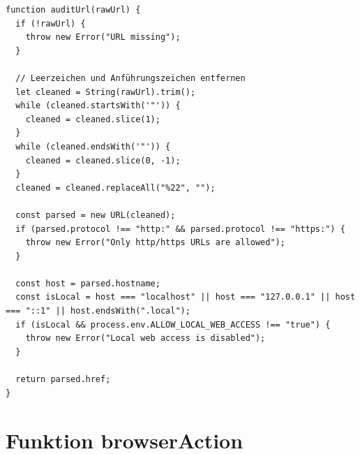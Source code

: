 \begin{lstlisting}
function auditUrl(rawUrl) {
  if (!rawUrl) {
    throw new Error("URL missing");
  }

  // Leerzeichen und Anführungszeichen entfernen
  let cleaned = String(rawUrl).trim();
  while (cleaned.startsWith('"')) {
    cleaned = cleaned.slice(1);
  }
  while (cleaned.endsWith('"')) {
    cleaned = cleaned.slice(0, -1);
  }
  cleaned = cleaned.replaceAll("%22", "");

  const parsed = new URL(cleaned);
  if (parsed.protocol !== "http:" && parsed.protocol !== "https:") {
    throw new Error("Only http/https URLs are allowed");
  }

  const host = parsed.hostname;
  const isLocal = host === "localhost" || host === "127.0.0.1" || host === "::1" || host.endsWith(".local");
  if (isLocal && process.env.ALLOW_LOCAL_WEB_ACCESS !== "true") {
    throw new Error("Local web access is disabled");
  }

  return parsed.href;
}
\end{lstlisting}

\section{Funktion browserAction}

